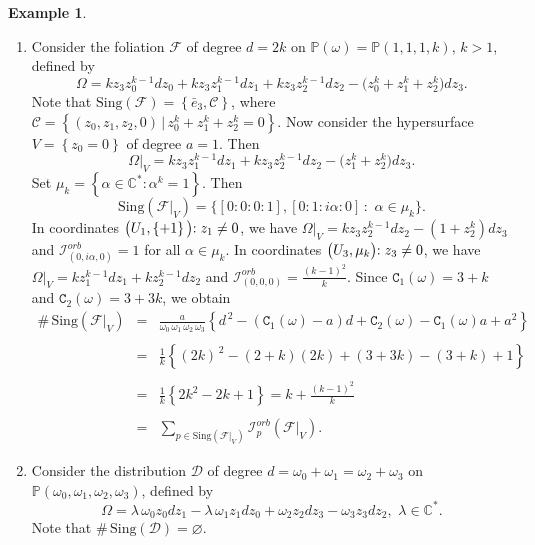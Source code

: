 \documentclass[11pt]{amsart}
\theoremstyle{plain}
\theoremstyle{definition}
\newtheorem{exe}{Example}[section]
\begin{document}
\begin{exe} $\mbox{}$
\vspace{0,1cm}
\begin{enumerate}
\item Consider the foliation $\mathcal{F}$ of degree $d=2k$ 
on $\mathbb{P}(\omega)=\mathbb{P}(1,1,1,k)$, $k>1$, defined by 
$$\Omega=kz_3z_0^{k-1}dz_0+kz_3z_1^{k-1}dz_1+kz_3z_2^{k-1}dz_2-\big(z_0^k+z_1^k+z_2^k\big)dz_3.$$ 
Note that $\mathrm{Sing}(\mathcal{F})=\left\{\bar{e}_3,\mathcal{C}\right\}$, where 
$\mathcal{C}=\left\{(z_0,z_1,z_2,0)\,|\,z_0^k+z_1^k+z_2^k=0\right\}$. Now consider the hypersurface $V=\left\{z_0=0\right\}$ of degree 
$a=1$. Then
$$\Omega|_V=kz_3z_1^{k-1}dz_1+kz_3z_2^{k-1}dz_2-\big(z_1^k+z_2^k\big)dz_3.$$
Set $\mu_k=\left\{\alpha\in\mathbb{C}^{\ast}:\alpha^k=1\right\}$. Then
$$\mathrm{Sing}\left(\mathcal{F}|_V\right)=\big\{\left[0:0:0:1\right], \left[0:1:i\alpha:0\right]\,:\,\,\alpha\in\mu_k\big\}.$$ 
In coordinates $\big(U_1,\left\{+1\right\}\big)\hspace{-1mm}:z_1\neq0$, we have 
$\Omega|_V=kz_3z_2^{k-1}dz_2-(1+z_2^k)dz_3$ and $\mathcal{I}^{orb}_{(0,i\alpha,0)}=1$ for all $\alpha\in\mu_k$. 
In coordinates $\big(U_3,\mu_k\big)\hspace{-1mm}:z_3\neq0$, we have $\Omega|_V=kz_1^{k-1}dz_1+kz_2^{k-1}dz_2$ and  
$\mathcal{I}^{orb}_{(0,0,0)}=\frac{(k-1)^2}{k}$. Since $\texttt{C}_1(\omega)=3+k$ and $\texttt{C}_2(\omega)=3+3k$, we obtain 
\begin{eqnarray*}
\#\,\mathrm{Sing}(\mathcal{F}|_V)&=&\frac{a}{\omega_0\,\omega_1\,\omega_2\,\omega_3}
\left\{d^{\,2}-(\texttt{C}_1(\omega)-a)d+\texttt{C}_2(\omega)-\texttt{C}_1(\omega)a+a^2\right\} \\ \\
&=& \frac{1}{k}\left\{(2k)^{\,2}-(2+k)(2k)+(3+3k)-(3+k)+1\right\} \\ \\
&=& \frac{1}{k}\left\{2k^2-2k+1\right\}=k+\frac{(k-1)^2}{k} \\ \\
&=& \sum_{p\in\mathrm{Sing}\left(\mathcal{F}|_V\right)}\mathcal{I}_p^{orb}\left(\mathcal{F}|_V\right).
\end{eqnarray*}
\vskip 0.1cm
\item Consider the distribution $\mathcal{D}$ of degree $d=\omega_0+\omega_1=\omega_2+\omega_3$ 
on $\mathbb{P}(\omega_0,\omega_1,\omega_2,\omega_3)$, defined by 
$$\Omega=\lambda\,\omega_0z_0dz_1-\lambda\,\omega_1z_1dz_0+\omega_2z_2dz_3-\omega_3z_3dz_2,\,\,\lambda\in\mathbb{C}^{\ast}.$$ 
Note that $\#\,\mathrm{Sing}(\mathcal{D})=\varnothing$.

\end{enumerate}
\end{exe}
\end{document}
